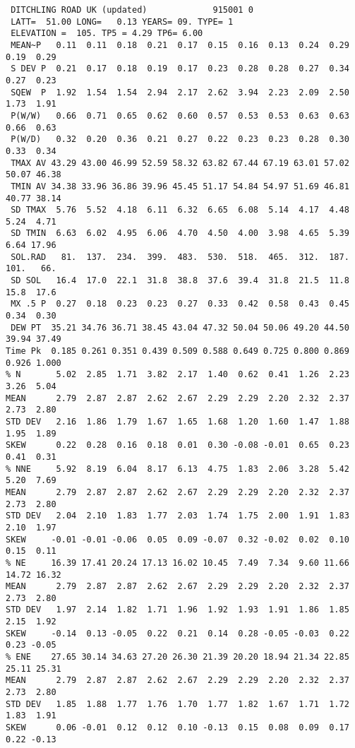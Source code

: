\begin{verbatim}
 DITCHLING ROAD UK (updated)             915001 0
 LATT=  51.00 LONG=   0.13 YEARS= 09. TYPE= 1
 ELEVATION =  105. TP5 = 4.29 TP6= 6.00
 MEAN~P   0.11  0.11  0.18  0.21  0.17  0.15  0.16  0.13  0.24  0.29  0.19  0.29  
 S DEV P  0.21  0.17  0.18  0.19  0.17  0.23  0.28  0.28  0.27  0.34  0.27  0.23
 SQEW  P  1.92  1.54  1.54  2.94  2.17  2.62  3.94  2.23  2.09  2.50  1.73  1.91
 P(W/W)   0.66  0.71  0.65  0.62  0.60  0.57  0.53  0.53  0.63  0.63  0.66  0.63
 P(W/D)   0.32  0.20  0.36  0.21  0.27  0.22  0.23  0.23  0.28  0.30  0.33  0.34
 TMAX AV 43.29 43.00 46.99 52.59 58.32 63.82 67.44 67.19 63.01 57.02 50.07 46.38
 TMIN AV 34.38 33.96 36.86 39.96 45.45 51.17 54.84 54.97 51.69 46.81 40.77 38.14
 SD TMAX  5.76  5.52  4.18  6.11  6.32  6.65  6.08  5.14  4.17  4.48  5.24  4.71
 SD TMIN  6.63  6.02  4.95  6.06  4.70  4.50  4.00  3.98  4.65  5.39  6.64 17.96
 SOL.RAD   81.  137.  234.  399.  483.  530.  518.  465.  312.  187.  101.   66.
 SD SOL   16.4  17.0  22.1  31.8  38.8  37.6  39.4  31.8  21.5  11.8  15.8  17.6
 MX .5 P  0.27  0.18  0.23  0.23  0.27  0.33  0.42  0.58  0.43  0.45  0.34  0.30
 DEW PT  35.21 34.76 36.71 38.45 43.04 47.32 50.04 50.06 49.20 44.50 39.94 37.49
Time Pk  0.185 0.261 0.351 0.439 0.509 0.588 0.649 0.725 0.800 0.869 0.926 1.000 
% N       5.02  2.85  1.71  3.82  2.17  1.40  0.62  0.41  1.26  2.23  3.26  5.04
MEAN      2.79  2.87  2.87  2.62  2.67  2.29  2.29  2.20  2.32  2.37  2.73  2.80
STD DEV   2.16  1.86  1.79  1.67  1.65  1.68  1.20  1.60  1.47  1.88  1.95  1.89
SKEW      0.22  0.28  0.16  0.18  0.01  0.30 -0.08 -0.01  0.65  0.23  0.41  0.31
% NNE     5.92  8.19  6.04  8.17  6.13  4.75  1.83  2.06  3.28  5.42  5.20  7.69
MEAN      2.79  2.87  2.87  2.62  2.67  2.29  2.29  2.20  2.32  2.37  2.73  2.80
STD DEV   2.04  2.10  1.83  1.77  2.03  1.74  1.75  2.00  1.91  1.83  2.10  1.97
SKEW     -0.01 -0.01 -0.06  0.05  0.09 -0.07  0.32 -0.02  0.02  0.10  0.15  0.11
% NE     16.39 17.41 20.24 17.13 16.02 10.45  7.49  7.34  9.60 11.66 14.72 16.32
MEAN      2.79  2.87  2.87  2.62  2.67  2.29  2.29  2.20  2.32  2.37  2.73  2.80
STD DEV   1.97  2.14  1.82  1.71  1.96  1.92  1.93  1.91  1.86  1.85  2.15  1.92
SKEW     -0.14  0.13 -0.05  0.22  0.21  0.14  0.28 -0.05 -0.03  0.22  0.23 -0.05
% ENE    27.65 30.14 34.63 27.20 26.30 21.39 20.20 18.94 21.34 22.85 25.11 25.31
MEAN      2.79  2.87  2.87  2.62  2.67  2.29  2.29  2.20  2.32  2.37  2.73  2.80
STD DEV   1.85  1.88  1.77  1.76  1.70  1.77  1.82  1.67  1.71  1.72  1.83  1.91
SKEW      0.06 -0.01  0.12  0.12  0.10 -0.13  0.15  0.08  0.09  0.17  0.22 -0.13

\end{verbatim}
